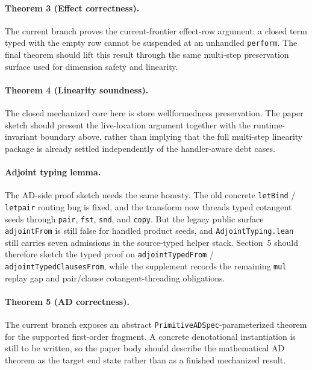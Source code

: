 \paragraph{Theorem 3 (Effect correctness).}
The current branch proves the current-frontier effect-row argument: a closed term typed with the empty row cannot be suspended at an unhandled \texttt{perform}. The final theorem should lift this result through the same multi-step preservation surface used for dimension safety and linearity.

\paragraph{Theorem 4 (Linearity soundness).}
The closed mechanized core here is store wellformedness preservation. The paper sketch should present the live-location argument together with the runtime-invariant boundary above, rather than implying that the full multi-step linearity package is already settled independently of the handler-aware debt cases.

\paragraph{Adjoint typing lemma.}
The AD-side proof sketch needs the same honesty. The old concrete \texttt{letBind} / \texttt{letpair} routing bug is fixed, and the transform now threads typed cotangent seeds through \texttt{pair}, \texttt{fst}, \texttt{snd}, and \texttt{copy}. But the legacy public surface \texttt{adjointFrom} is still false for handled product seeds, and \texttt{AdjointTyping.lean} still carries seven admissions in the source-typed helper stack. Section~5 should therefore sketch the typed proof on \texttt{adjointTypedFrom} / \texttt{adjointTypedClausesFrom}, while the supplement records the remaining \texttt{mul} replay gap and pair/clause cotangent-threading obligations.

\paragraph{Theorem 5 (AD correctness).}
The current branch exposes an abstract \texttt{PrimitiveADSpec}-parameterized theorem for the supported first-order fragment. A concrete denotational instantiation is still to be written, so the paper body should describe the mathematical AD theorem as the target end state rather than as a finished mechanized result.
